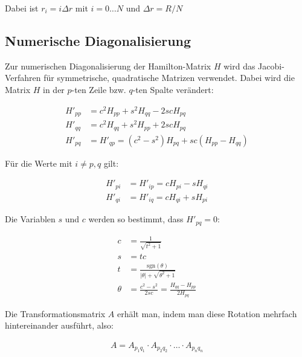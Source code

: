Dabei ist $r_i = i \Delta r$ mit $i = 0 \dots N$ und $\Delta r = R/N$

\subsection{Numerische Diagonalisierung}
\label{sec:num-diag}

Zur numerischen Diagonalisierung der Hamilton-Matrix $H$ wird das
Jacobi-Verfahren für symmetrische, quadratische Matrizen
verwendet. Dabei wird die Matrix $H$ in der $p$-ten Zeile bzw. $q$-ten
Spalte verändert:

\begin{align}
  H'_{p p} &= c^2 H_{p p} + s^2 H_{q q} - 2 s c H_{p q}\\
  H'_{q q} &= c^2 H_{q q} + s^2 H_{p p} + 2 s c H_{p q}\\
  H'_{p q} &= H'_{q p} = (c^2 - s^2) H_{p q} + s c (H_{p p} - H_{q q})
\end{align}

Für die Werte mit $i \neq p, q$ gilt:

\begin{align}
  H'_{p i} &= H'_{i p} = c H_{p i} - s H_{q i}\\
  H'_{q i} &= H'_{i q} = c H_{q i} + s H_{p i}
\end{align}

Die Variablen $s$ und $c$ werden so bestimmt, dass $H'_{p q} = 0$:

\begin{align}
  c &= \frac{1}{\sqrt{t^2 + 1}}\\
  s &= t c\\
  t &= \frac{\text{sgn}(\theta)}{| \theta | + \sqrt{\theta^2 + 1}}\\
  \theta &= \frac{c^2-s^2}{2 s c} = \frac{H_{q q} - H_{p p}}{2 H_{p q}}
\end{align}

Die Transformationsmatrix $A$ erhält man, indem man diese Rotation
mehrfach hintereinander ausführt, also:

\begin{align}
  A = A_{p_1 q_1} \cdotp A_{p_2 q_2} \cdotp \dots \cdotp A_{p_n q_n}
\end{align}

